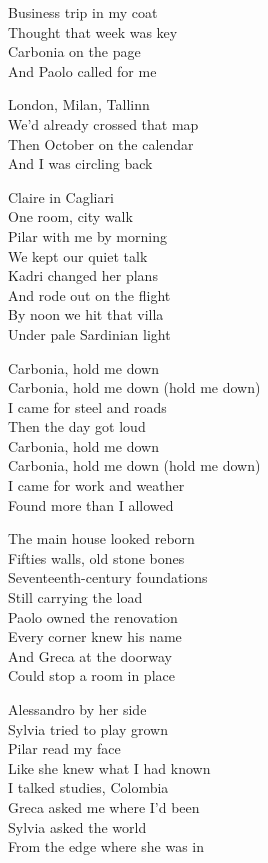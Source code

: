 \begin{lyrics}
Business trip in my coat\\
Thought that week was key\\
Carbonia on the page\\
And Paolo called for me

London, Milan, Tallinn\\
We’d already crossed that map\\
Then October on the calendar\\
And I was circling back

Claire in Cagliari\\
One room, city walk\\
Pilar with me by morning\\
We kept our quiet talk\\
Kadri changed her plans\\
And rode out on the flight\\
By noon we hit that villa\\
Under pale Sardinian light

Carbonia, hold me down\\
Carbonia, hold me down (hold me down)\\
I came for steel and roads\\
Then the day got loud\\
Carbonia, hold me down\\
Carbonia, hold me down (hold me down)\\
I came for work and weather\\
Found more than I allowed

The main house looked reborn\\
Fifties walls, old stone bones\\
Seventeenth-century foundations\\
Still carrying the load\\
Paolo owned the renovation\\
Every corner knew his name\\
And Greca at the doorway\\
Could stop a room in place

Alessandro by her side\\
Sylvia tried to play grown\\
Pilar read my face\\
Like she knew what I had known\\
I talked studies, Colombia\\
Greca asked me where I’d been\\
Sylvia asked the world\\
From the edge where she was in


\end{lyrics}
